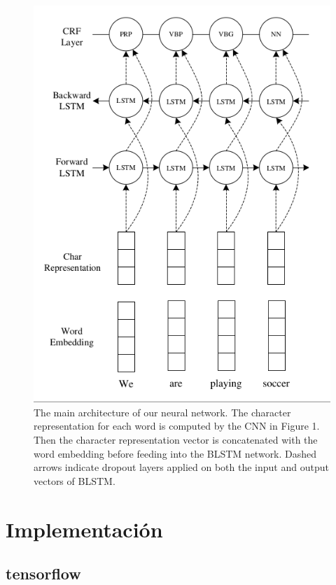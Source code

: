 \documentclass[runningheads]{llncs}
\begin{document}

\begin{figure}
	\centering
	\includegraphics[width=12cm]{Fig_3.png}
	\caption{  The main architecture of our neural
		network. The character representation for each
		word is computed by the CNN in Figure 1. Then
		the character representation vector is concatenated
		with the word embedding before feeding into the
		BLSTM network. Dashed arrows indicate dropout
		layers applied on both the input and output vectors
		of BLSTM.}
	\label{F3}
\end{figure}





\section{Implementación}

\subsection{tensorflow}
\end{document}
